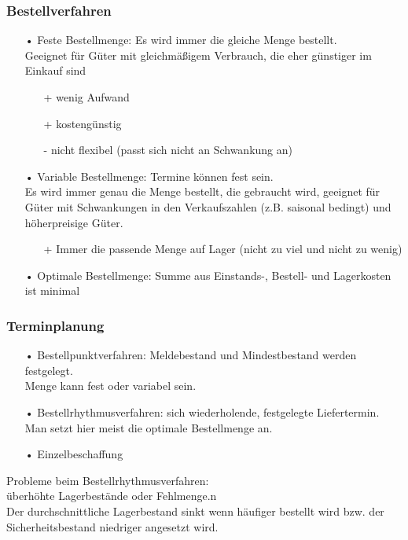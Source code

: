 \documentclass[asp1.tex]{subfiles}
\begin{document}
\subsubsection{Bestellverfahren}
\begin{itemize}
    \item[•]Feste Bestellmenge: Es wird immer die gleiche Menge bestellt.  \\ Geeignet für Güter mit gleichmäßigem Verbrauch, die eher günstiger im Einkauf sind
          \begin{itemize}
              \item[+] wenig Aufwand
              \item[+] kostengünstig
              \item[-] nicht flexibel (passt sich nicht an Schwankung an)
          \end{itemize}
    \item[•]Variable Bestellmenge: Termine können fest sein. \\
          Es wird immer genau die Menge bestellt, die gebraucht wird, geeignet für Güter mit Schwankungen in den Verkaufszahlen (z.B. saisonal bedingt) und höherpreisige Güter.
          \begin{itemize}
              \item[+]Immer die passende Menge auf Lager (nicht zu viel und nicht zu wenig)
          \end{itemize}
    \item[•]Optimale Bestellmenge: Summe aus Einstands-, Bestell- und Lagerkosten ist minimal
\end{itemize}

\subsubsection{Terminplanung}
\begin{itemize}
    \item[•]Bestellpunktverfahren: Meldebestand und Mindestbestand werden festgelegt.\\
          Menge kann fest oder variabel sein.
    \item[•]Bestellrhythmusverfahren: sich wiederholende, festgelegte Liefertermin.\\
          Man setzt hier meist die optimale Bestellmenge an.
    \item[•]Einzelbeschaffung
\end{itemize}

Probleme beim Bestellrhythmusverfahren: \\
überhöhte Lagerbestände oder Fehlmenge.n\\
Der durchschnittliche Lagerbestand sinkt wenn häufiger bestellt wird bzw. der Sicherheitsbestand niedriger angesetzt wird.
\end{document}
